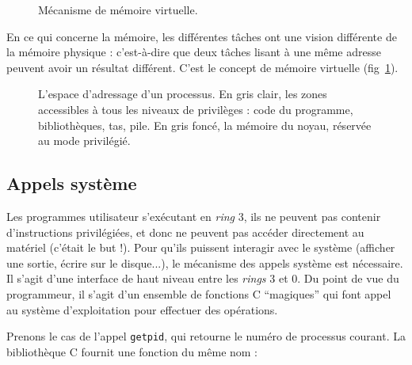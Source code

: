\begin{figure}
\centering
{}
\caption{Mécanisme de mémoire virtuelle.}
\label{fig:memoire-virtuelle}
\end{figure}

En ce qui concerne la mémoire, les différentes tâches ont une vision différente
de la mémoire physique : c'est-à-dire que deux tâches lisant à une même adresse
peuvent avoir un résultat différent. C'est le concept de mémoire virtuelle
(fig~\ref{fig:memoire-virtuelle}).

\begin{figure}
\centering
\fbox{
  
}

\caption{L'espace d'adressage d'un processus. En gris clair, les zones
accessibles à tous les niveaux de privilèges : code du programme, bibliothèques,
tas, pile. En gris foncé, la mémoire du noyau, réservée au mode privilégié.}

\label{fig:memmap}
\end{figure}

\subsection{Appels système}

Les programmes utilisateur s'exécutant en \emph{ring} 3, ils ne peuvent pas
contenir d'instructions privilégiées, et donc ne peuvent pas accéder directement
au matériel (c'était le but !). Pour qu'ils puissent interagir avec le système
(afficher une sortie, écrire sur le disque...), le mécanisme des appels système
est nécessaire. Il s'agit d'une interface de haut niveau entre les \emph{rings}
3 et 0. Du point de vue du programmeur, il s'agit d'un ensemble de fonctions C
``magiques'' qui font appel au système d'exploitation pour effectuer des
opérations.

Prenons le cas de l'appel \texttt{getpid}, qui retourne le numéro de processus
courant. La bibliothèque C fournit une fonction du même nom :

